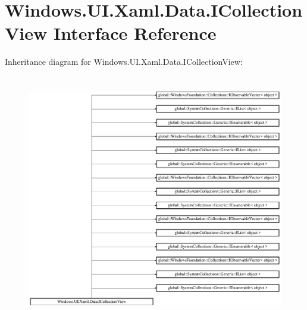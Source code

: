 \hypertarget{interface_windows_1_1_u_i_1_1_xaml_1_1_data_1_1_i_collection_view}{}\section{Windows.\+U\+I.\+Xaml.\+Data.\+I\+Collection\+View Interface Reference}
\label{interface_windows_1_1_u_i_1_1_xaml_1_1_data_1_1_i_collection_view}
Inheritance diagram for Windows.\+U\+I.\+Xaml.\+Data.\+I\+Collection\+View\+:\begin{figure}[H]
\begin{center}
\leavevmode
\includegraphics[height=10.873786cm]{interface_windows_1_1_u_i_1_1_xaml_1_1_data_1_1_i_collection_view}
\end{center}
\end{figure}
